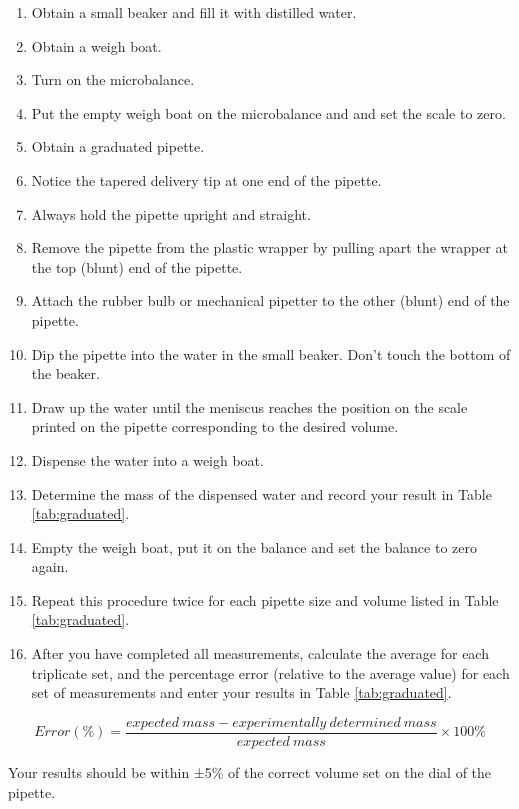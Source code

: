 \documentclass[]{book}
\providecommand{\tightlist}{%
  \setlength{\itemsep}{0pt}\setlength{\parskip}{0pt}}
\begin{document}
\begin{enumerate}
\def\labelenumi{\arabic{enumi}.}
\tightlist
\item
  Obtain a small beaker and fill it with distilled water.
\item
  Obtain a weigh boat.
\item
  Turn on the microbalance.
\item
  Put the empty weigh boat on the microbalance and and set the scale to zero.
\item
  Obtain a graduated pipette.
\item
  Notice the tapered delivery tip at one end of the pipette.
\item
  Always hold the pipette upright and straight.
\item
  Remove the pipette from the plastic wrapper by pulling apart the wrapper at the top (blunt) end of the pipette.
\item
  Attach the rubber bulb or mechanical pipetter to the other (blunt) end of the pipette.
\item
  Dip the pipette into the water in the small beaker. Don't touch the bottom of the beaker.
\item
  Draw up the water until the meniscus reaches the position on the scale printed on the pipette corresponding to the desired volume.
\item
  Dispense the water into a weigh boat.
\item
  Determine the mass of the dispensed water and record your result in Table \ref{tab:graduated}.
\item
  Empty the weigh boat, put it on the balance and set the balance to zero again.
\item
  Repeat this procedure twice for each pipette size and volume listed in Table \ref{tab:graduated}.
\item
  After you have completed all measurements, calculate the average for each triplicate set, and the percentage error (relative to the average value) for each set of measurements and enter your results in Table \ref{tab:graduated}.
\end{enumerate}

\[ Error (\%) = \frac{expected\ mass - experimentally\ determined\ mass}{expected\ mass} \times 100\% \]

Your results should be within ±5\% of the correct volume set on the dial of the pipette.
\end{document}
